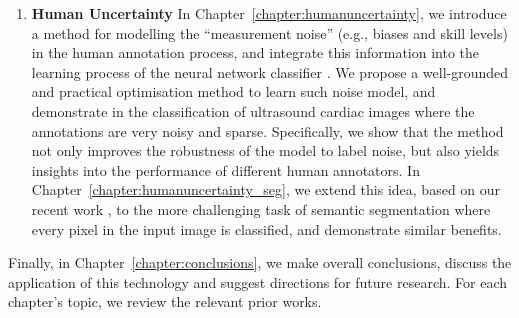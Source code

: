 \begin{enumerate}[label=(\alph*)]
	\item \textbf{Human Uncertainty} In Chapter~\ref{chapter:humanuncertainty}, we introduce a method for modelling the ``measurement noise'' (e.g., biases and skill levels) in the human annotation process, and integrate this information into the learning process of the neural network classifier \cite{tanno2019learning}. We propose a well-grounded and practical optimisation method to learn such noise model, and demonstrate in the classification of ultrasound cardiac images where the annotations are very noisy and sparse. Specifically, we show that the method not only improves the robustness of the model to label noise, but also yields insights into the performance of different human annotators. In Chapter~\ref{chapter:humanuncertainty_seg}, we 
extend this idea, based on our recent work \cite{zhang2020disentangling}, to the more challenging task of semantic segmentation where every pixel in the input image is classified, and demonstrate similar benefits. 

\end{enumerate}

Finally, in Chapter~\ref{chapter:conclusions}, we make overall conclusions, discuss the application of this technology and suggest directions for future research. For each chapter’s topic, we review the relevant prior works. 



